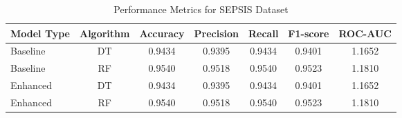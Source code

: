 \begin{table}[ht]
\centering
\caption{Performance Metrics for SEPSIS Dataset}
\begin{tabular}{lcccccc}
\toprule
Model Type & Algorithm & Accuracy & Precision & Recall & F1-score & ROC-AUC \\
\midrule
Baseline & DT & 0.9434 & 0.9395 & 0.9434 & 0.9401 & 1.1652 \\
Baseline & RF & 0.9540 & 0.9518 & 0.9540 & 0.9523 & 1.1810 \\
Enhanced & DT & 0.9434 & 0.9395 & 0.9434 & 0.9401 & 1.1652 \\
Enhanced & RF & 0.9540 & 0.9518 & 0.9540 & 0.9523 & 1.1810 \\
\bottomrule
\end{tabular}
\label{tab:sepsis_performance}
\end{table}
